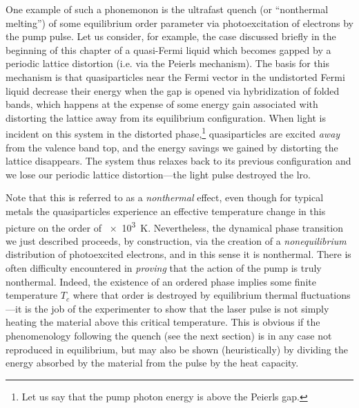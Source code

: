 One example of such a phonemonon is the ultrafast quench (or ``nonthermal melting'') of some equilibrium order parameter via photoexcitation of electrons by the pump pulse.
Let us consider, for example, the case discussed briefly in the beginning of this chapter of a quasi-\oned Fermi liquid which becomes gapped by a periodic lattice distortion (i.e. via the Peierls mechanism).
The basis for this mechanism is that quasiparticles near the Fermi vector in the undistorted Fermi liquid decrease their energy when the gap is opened via hybridization of folded bands, which happens at the expense of some energy gain associated with distorting the lattice away from its equilibrium configuration.
When light is incident on this system in the distorted phase,\footnote{Let us say that the pump photon energy is above the Peierls gap.} quasiparticles are excited \emph{away} from the valence band top, and the energy savings we gained by distorting the lattice disappears.
The system thus relaxes back to its previous configuration and we lose our periodic lattice distortion---the light pulse destroyed the \gls{lro}.

Note that this is referred to as a \emph{nonthermal} effect, even though for typical metals the quasiparticles experience an effective temperature change in this picture on the order of \qty{e3}{K}\citep{rethfeld_ultrafast_2002}.
Nevertheless, the dynamical phase transition we just described proceeds, by construction, via the creation of a \emph{nonequilibrium} distribution of photoexcited electrons, and in this sense it is nonthermal.
There is often difficulty encountered in \emph{proving} that the action of the pump is truly nonthermal.
Indeed, the existence of an ordered phase implies some finite temperature $T_c$ where that order is destroyed by equilibrium thermal fluctuations---it is the job of the experimenter to show that the laser pulse is not simply heating the material above this critical temperature.
This is obvious if the phenomenology following the quench (see the next section) is in any case not reproduced in equilibrium, but may also be shown (heuristically) by dividing the energy absorbed by the material from the pulse by the heat capacity.



